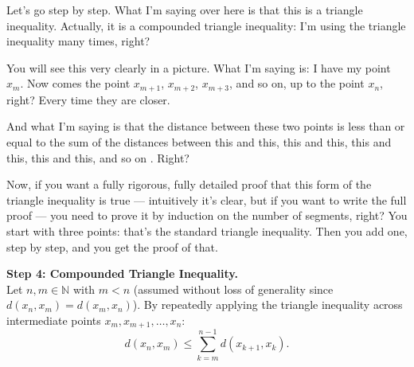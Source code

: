 \begin{proofWrapper}
\begin{speech}[00:31:57 - 00:33:27]
Let's go step by step. What I'm saying over here is that this is a triangle inequality. Actually, it is a compounded triangle inequality: I'm using the triangle inequality many times, right?

You will see this very clearly in a picture. What I'm saying is: I have my point $x_m$. Now comes the point $x_{m+1}$, $x_{m+2}$, $x_{m+3}$, and so on, up to the point $x_n$, right? Every time they are closer.

And what I'm saying is that the distance between these two points  is less than or equal to the sum of the distances between this and this, this and this, this and this, this and this, and so on . Right?

Now, if you want a fully rigorous, fully detailed proof that this form of the triangle inequality is true --- intuitively it's clear, but if you want to write the full proof --- you need to prove it by induction on the number of segments, right? You start with three points: that's the standard triangle inequality. Then you add one, step by step, and you get the proof of that.
\end{speech}

\begin{content}
\textbf{Step 4: Compounded Triangle Inequality.} \\
Let $n, m \in \mathbb{N}$ with $m < n$ (assumed without loss of generality since $d(x_n, x_m) = d(x_m, x_n)$). By repeatedly applying the triangle inequality across intermediate points $x_m, x_{m+1}, \dots, x_n$:
\begin{equation}\label{eq:compounded-triangle-inequality}
d(x_n, x_m) \le \sum_{k=m}^{n-1} d(x_{k+1}, x_k).
\end{equation}

\begin{center}
\begin{tikzpicture}[scale=1.4, >=Stealth]


\end{tikzpicture}
\end{center}
\end{content}
\end{proofWrapper}

